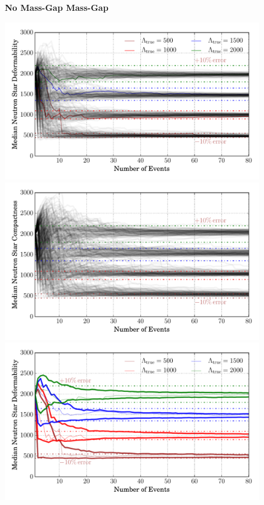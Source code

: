 \documentclass[aps,prd,amsmath,floats,floatfix, twocolumn,
superscriptaddress,nofootinbib,showpacs]{revtex4-1}
\begin{document}
\begin{figure}
\centering
\textbf{No Mass-Gap \hspace{6cm} Mass-Gap}\par\medskip
\includegraphics[trim=1cm 0 0 0, width=1.025\columnwidth]{plots/LambdaMedian_vs_N_AllPopulation}
\includegraphics[trim=0 0 1cm 0, width=1.025\columnwidth]{plots/LambdaMedian_vs_N_AstroPopulation}\\
\includegraphics[trim=1cm 0 0 0, width=1.025\columnwidth]{plots/LambdaMedian90pc_vs_N_AllPopulation}

\end{figure}
\end{document}
